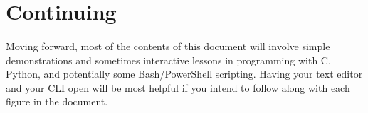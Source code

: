 \section{Continuing}
\paragraph{}
   Moving forward, most of the contents of this document will involve simple demonstrations and sometimes interactive lessons in programming with C, Python,
   and potentially some Bash/PowerShell scripting. Having your text editor and your CLI open will be most helpful if you intend to follow along with each
   figure in the document.
